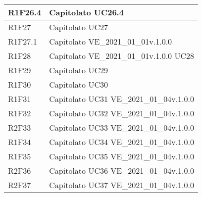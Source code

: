 \begin{center}
\begin{longtable}{|p{22mm}|p{44mm}|}
R1F26.4 &
Capitolato \newline
UC26.4 
\\
\hline

R1F27 &
Capitolato \newline
UC27 
\\
\hline

R1F27.1 &
Capitolato \newline
VE\_2021\_01\_01v.1.0.0 
\\
\hline

R1F28 &
Capitolato \newline
VE\_2021\_01\_01v.1.0.0 \newline
UC28 
\\
\hline

R1F29 &
Capitolato \newline
UC29 
\\
\hline

R1F30 &
Capitolato \newline
UC30 
\\
\hline

R1F31 &
Capitolato \newline
UC31 \newline
VE\_2021\_01\_04v.1.0.0 
\\
\hline

R1F32 &
Capitolato \newline
UC32 \newline
VE\_2021\_01\_04v.1.0.0 
\\
\hline

R2F33 &
Capitolato \newline
UC33 \newline
VE\_2021\_01\_04v.1.0.0 
\\
\hline

R1F34 &
Capitolato \newline
UC34 \newline
VE\_2021\_01\_04v.1.0.0 
\\
\hline

R1F35 &
Capitolato \newline
UC35 \newline
VE\_2021\_01\_04v.1.0.0 
\\
\hline

R2F36 &
Capitolato \newline
UC36 \newline
VE\_2021\_01\_04v.1.0.0 
\\
\hline

R2F37 &
Capitolato \newline
UC37 \newline
VE\_2021\_01\_04v.1.0.0 
\\
\hline


\end{longtable}
\end{center}
